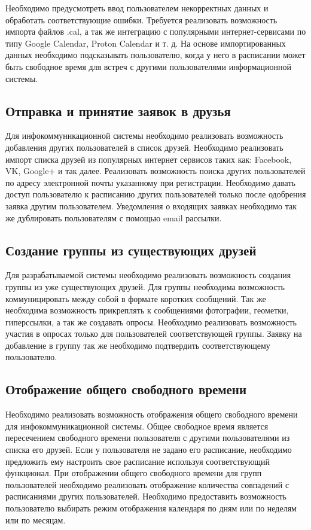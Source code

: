 \documentclass[14pt]{extreport}
\begin{document}
                Необходимо предусмотреть ввод пользователем некорректных данных и обработать соответствующие ошибки. Требуется реализовать возможность импорта файлов .cal, а так же интеграцию с популярными интернет-сервисами по типу Google Calendar, Proton Calendar и т. д. На основе импортированных данных необходимо подсказывать пользователю, когда у него в расписании может быть свободное время для встреч с другими пользователями информационной системы. 

            \subsection{Отправка и принятие заявок в друзья} 
                Для инфокоммуникационной системы необходимо реализовать возможность добавления других пользователей в список друзей. Необходимо реализовать импорт списка друзей из популярных интернет сервисов таких как: Facebook, VK, Google+ и так далее. Реализовать возможность поиска других пользователей по адресу электронной почты указанному при регистрации. Необходимо давать доступ пользователю к расписанию других пользователей только после одобрения заявка другим пользователем. Уведомления о входящих заявках необходимо так же дублировать пользователям с помощью email рассылки. 

            \subsection{Создание группы из существующих друзей}
                Для разрабатываемой системы необходимо реализовать возможность создания группы из уже существующих друзей. Для группы необходима возможность коммуницировать между собой в формате коротких сообщений. Так же необходима возможность прикреплять к сообщениями фотографии, геометки, гиперссылки, а так же создавать опросы. Необходимо реализовать возможность участия в опросах только для пользователей соответствующей группы. Заявку на добавление в группу так же необходимо подтвердить соответствующему пользователю. 

            \subsection{Отображение общего свободного времени}
                Необходимо реализовать возможность отображения общего свободного времени для инфокоммуникационной системы. Общее свободное время является пересечением свободного времени пользователя с другими пользователями из списка его друзей. Если у пользователя не задано его расписание, необходимо предложить ему настроить свое расписание используя соответствующий функционал. При отображении общего свободного времени для групп пользователей необходимо реализовать отображение количества совпадений с расписаниями других пользователей. Необходимо предоставить возможность пользователю выбирать режим отображения календаря по дням или по неделям или по месяцам. 
                
\end{document}
